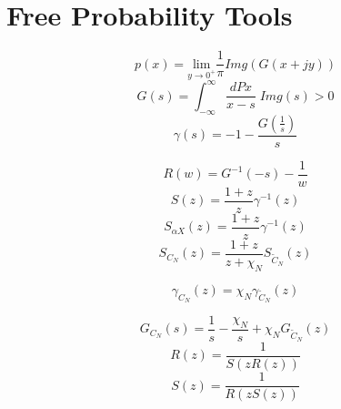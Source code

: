 \documentclass[12pt,a4paper]{report}
\begin{document}
\section{Free Probability Tools}
\begin{equation}
p(x) = \underset{y \rightarrow 0^+}{\text{lim}} \frac{1}{\pi}\textit{Img}( G(x + jy))
\end{equation}
\begin{equation}
G(s) = \int_{-\infty}^{\infty} \frac{dPx}{x-s} \; \textit{Img} (s) > 0 
\end{equation}
\begin{equation}
\gamma(s) =  -1 - \frac{G(\frac{1}{s})}{s}
\end{equation}
 
 \begin{equation}
R(w) = G^{-1}(-s) - \frac{1}{w}
\end{equation}
 \begin{equation}
S(z) = \frac{1+z}{z} \gamma^{-1}	(z)
\end{equation}
 \begin{equation}
S_{\alpha X}(z) = \frac{1+z}{z} \gamma^{-1}	(z)
\end{equation}
 \begin{equation}
S_{C_N}(z) = \frac{1+z}{z+\chi_N} S_{\tilde{C}_N}(z)
\end{equation}

 \begin{equation}
\gamma_{C_N}	(z) = \chi_N \gamma_{\tilde{C}_N}	(z)
\end{equation}

\begin{equation}
G_{C_N}	(s) = \frac{1}{s}  - \frac{\chi_N}{s} + \chi_N  G_{\tilde{C}_N}	(z)
\end{equation}
\begin{equation}
R(z) = \frac{1}{S(zR(z))}
\end{equation}
\begin{equation}
S(z) = \frac{1}{R(zS(z))}
\end{equation}
\end{document}
